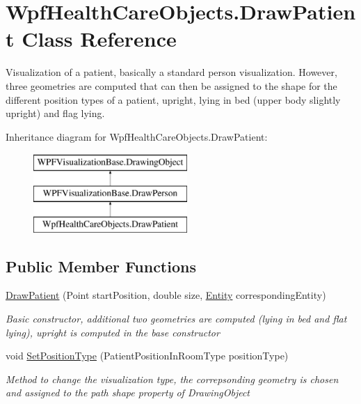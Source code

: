 \hypertarget{class_wpf_health_care_objects_1_1_draw_patient}{}\section{Wpf\+Health\+Care\+Objects.\+Draw\+Patient Class Reference}
\label{class_wpf_health_care_objects_1_1_draw_patient}


Visualization of a patient, basically a standard person visualization. However, three geometries are computed that can then be assigned to the shape for the different position types of a patient, upright, lying in bed (upper body slightly upright) and flag lying.  


Inheritance diagram for Wpf\+Health\+Care\+Objects.\+Draw\+Patient\+:\begin{figure}[H]
\begin{center}
\leavevmode
\includegraphics[height=3.000000cm]{class_wpf_health_care_objects_1_1_draw_patient}
\end{center}
\end{figure}
\subsection*{Public Member Functions}
\begin{DoxyCompactItemize}
\item 
\hyperlink{class_wpf_health_care_objects_1_1_draw_patient_a1cb6e10040b81068306c0f93f8c7fca7}{Draw\+Patient} (Point start\+Position, double size, \hyperlink{class_simulation_core_1_1_h_c_c_m_elements_1_1_entity}{Entity} corresponding\+Entity)
\begin{DoxyCompactList}\small\item\em Basic constructor, additional two geometries are computed (lying in bed and flat lying), upright is computed in the base constructor \end{DoxyCompactList}\item 
void \hyperlink{class_wpf_health_care_objects_1_1_draw_patient_a7e2a52e0dbcda1899c5adef7f04a731f}{Set\+Position\+Type} (Patient\+Position\+In\+Room\+Type position\+Type)
\begin{DoxyCompactList}\small\item\em Method to change the visualization type, the correpsonding geometry is chosen and assigned to the path shape property of Drawing\+Object \end{DoxyCompactList}\end{DoxyCompactItemize}
